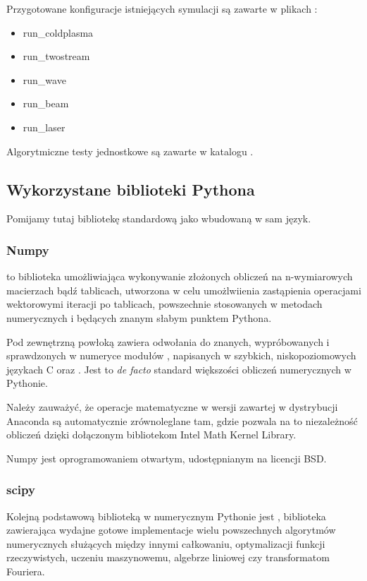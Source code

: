 Przygotowane konfiguracje istniejących symulacji są zawarte w plikach
: 
\begin{itemize}
    \item run\_coldplasma
    \item run\_twostream
    \item run\_wave
    \item run\_beam
    \item run\_laser
\end{itemize}

Algorytmiczne testy jednostkowe są zawarte w katalogu .

\subsection{Wykorzystane biblioteki Pythona}

Pomijamy tutaj bibliotekę standardową jako wbudowaną w sam język.

\subsubsection{Numpy}
\cite{numpy} to biblioteka umożliwiająca wykonywanie złożonych obliczeń na
n-wymiarowych macierzach bądź tablicach, utworzona w celu umożlwiienia
zastąpienia operacjami wektorowymi iteracji po tablicach, powszechnie
stosowanych w metodach numerycznych i będących znanym słabym punktem
Pythona.

Pod zewnętrzną powłoką zawiera odwołania do znanych, wypróbowanych i
sprawdzonych w numeryce modułów ,  napisanych w
szybkich, niskopoziomowych językach C oraz .  Jest to
\emph{de facto} standard większości obliczeń numerycznych w Pythonie.

Należy zauważyć, że operacje matematyczne w wersji  zawartej
w dystrybucji Anaconda są automatycznie
zrównoleglane tam, gdzie pozwala na to
niezależność obliczeń dzięki dołączonym bibliotekom Intel Math Kernel Library.\cite{intel-mkl} 

Numpy jest oprogramowaniem otwartym, udostępnianym na licencji BSD.


\subsubsection{scipy}
Kolejną podstawową biblioteką w numerycznym Pythonie jest ,
biblioteka zawierająca wydajne gotowe implementacje wielu powszechnych algorytmów
numerycznych służących między innymi całkowaniu, optymalizacji funkcji rzeczywistych,
uczeniu maszynowemu, algebrze liniowej czy transformatom Fouriera.

